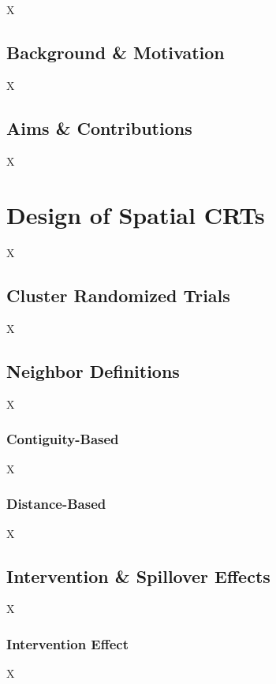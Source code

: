 \documentclass{article}[11pt]
\begin{document}
X

\subsection{Background \& Motivation}

X

\subsection{Aims \& Contributions}

X

\section{Design of Spatial CRTs}

X

\subsection{Cluster Randomized Trials}

X

\subsection{Neighbor Definitions}

X

\subsubsection{Contiguity-Based}

X

\subsubsection{Distance-Based}

X

\subsection{Intervention \& Spillover Effects}

X

\subsubsection{Intervention Effect}\label{Section:InterventionEffect}

X
\end{document}
